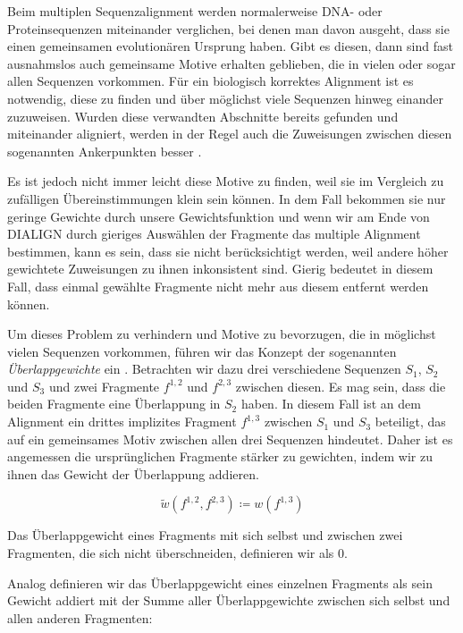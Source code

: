 Beim multiplen Sequenzalignment werden normalerweise DNA- oder Proteinsequenzen miteinander verglichen, bei denen man davon ausgeht, dass sie einen gemeinsamen evolutionären Ursprung haben. Gibt es diesen, dann sind fast ausnahmslos auch gemeinsame Motive erhalten geblieben, die in vielen oder sogar allen Sequenzen vorkommen. Für ein biologisch korrektes Alignment ist es notwendig, diese zu finden und über möglichst viele Sequenzen hinweg einander zuzuweisen. Wurden diese verwandten Abschnitte bereits gefunden und miteinander aligniert, werden in der Regel auch die Zuweisungen zwischen diesen sogenannten Ankerpunkten besser \cite{mpps06}.

Es ist jedoch nicht immer leicht diese Motive zu finden, weil sie im Vergleich zu zufälligen Übereinstimmungen klein sein können. In dem Fall bekommen sie nur geringe Gewichte durch unsere Gewichtsfunktion und wenn wir am Ende von DIALIGN durch gieriges Auswählen der Fragmente das multiple Alignment bestimmen, kann es sein, dass sie nicht berücksichtigt werden, weil andere höher gewichtete Zuweisungen zu ihnen inkonsistent sind. Gierig bedeutet in diesem Fall, dass einmal gewählte Fragmente nicht mehr aus diesem entfernt werden können.

Um dieses Problem zu verhindern und Motive zu bevorzugen, die in möglichst vielen Sequenzen vorkommen, führen wir das Konzept der sogenannten \emph{Überlappgewichte} ein \cite{mdw96}. Betrachten wir dazu drei verschiedene Sequenzen $S_1$, $S_2$ und $S_3$ und zwei Fragmente $f^{1,2}$ und $f^{2,3}$ zwischen diesen. Es mag sein, dass die beiden Fragmente eine Überlappung in $S_2$ haben. In diesem Fall ist an dem Alignment ein drittes implizites Fragment $f^{1,3}$ zwischen $S_1$ und $S_3$ beteiligt, das auf ein gemeinsames Motiv zwischen allen drei Sequenzen hindeutet. Daher ist es angemessen die ursprünglichen Fragmente stärker zu gewichten, indem wir zu ihnen das Gewicht der Überlappung addieren.

\begin{equation}
	\tilde{w}\left(f^{1,2},f^{2,3}\right) \coloneqq w\left(f^{1,3}\right)
\end{equation}

Das Überlappgewicht eines Fragments mit sich selbst und zwischen zwei Fragmenten, die sich nicht überschneiden, definieren wir als 0.

Analog definieren wir das Überlappgewicht eines einzelnen Fragments als sein Gewicht addiert mit der Summe aller Überlappgewichte zwischen sich selbst und allen anderen Fragmenten:

